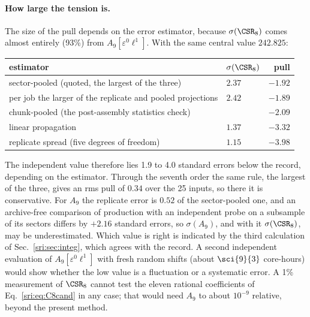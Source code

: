 \paragraph{How large the tension is.} The size of the pull depends on the error estimator, because $\sigma(\CSR_8)$
comes almost entirely (93\%) from $A_9[\varepsilon^0\ell^1]$. With the same central value $242.825$:
\begin{center}\small
\begin{tabular}{@{}llr@{}}
\toprule
estimator & $\sigma(\CSR_8)$ & pull\\
\midrule
sector-pooled (quoted, the largest of the three) & $2.37$ & $-1.92$\\
per job the larger of the replicate and pooled projections & $2.42$ & $-1.89$\\
chunk-pooled (the post-assembly statistics check) & & $-2.09$\\
linear propagation & $1.37$ & $-3.32$\\
replicate spread (five degrees of freedom) & $1.15$ & $-3.98$\\
\bottomrule
\end{tabular}
\end{center}
The independent value therefore lies 1.9 to 4.0 standard errors below the record, depending on the estimator. Through
the seventh order the same rule, the largest of the three, gives an rms pull of $0.34$ over the 25 inputs, so there it
is conservative. For $A_9$ the replicate error is $0.52$ of the sector-pooled one, and an archive-free comparison of
production with an independent probe on a subsample of its sectors differs by $+2.16$ standard errors, so
$\sigma(A_9)$, and with it $\sigma(\CSR_8)$, may be underestimated. Which value is right is indicated by the third
calculation of Sec.~\ref{sri:sec:integ}, which agrees with the record. A second independent evaluation of
$A_9[\varepsilon^0\ell^1]$ with fresh random shifts (about $\sci{9}{3}$ core-hours) would show whether the low value
is a fluctuation or a systematic error. A 1\%
measurement of $\CSR_8$ cannot test the eleven rational coefficients of Eq.~\eqref{sri:eq:C8cand} in any case; that would
need $A_9$ to about $10^{-9}$ relative, beyond the present method.

